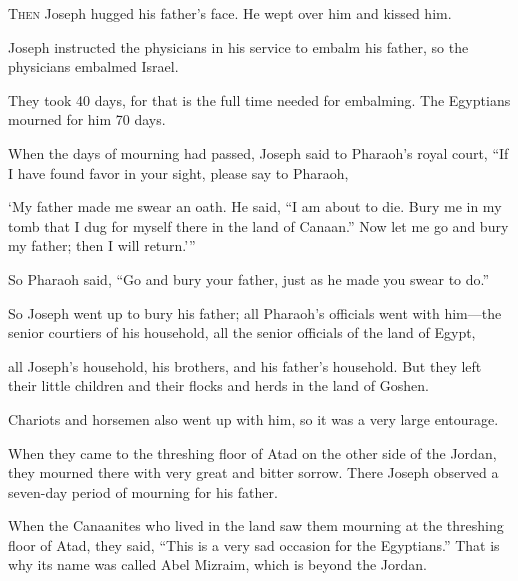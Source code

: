 \begin{scripture}
 \allowchapbreak\hypertarget{ch-genesis-50}{}\lettrine[lines=5]{\color{pentateuch}T}{\textsc{hen}} Joseph hugged his father's face. He wept over him and kissed him.\everypar{}
 Joseph instructed the physicians in his service to embalm his father, so the physicians embalmed Israel.
 They took 40 days, for that is the full time needed for embalming. The Egyptians mourned for him 70 days.
\everypar{}

 When the days of mourning had passed, Joseph said to Pharaoh's royal court, ``If I have found favor in your sight, please say to Pharaoh,
 `My father made me swear an oath. He said, ``I am about to die. Bury me in my tomb that I dug for myself there in the land of Canaan.'' Now let me go and bury my father; then I will return.'''
 So Pharaoh said, ``Go and bury your father, just as he made you swear to do.''
\everypar{}

 So Joseph went up to bury his father; all Pharaoh's officials went with him---the senior courtiers of his household, all the senior officials of the land of Egypt,
 all Joseph's household, his brothers, and his father's household. But they left their little children and their flocks and herds in the land of Goshen.
 Chariots and horsemen also went up with him, so it was a very large entourage.
\everypar{}

 When they came to the threshing floor of Atad on the other side of the Jordan, they mourned there with very great and bitter sorrow. There Joseph observed a seven-day period of mourning for his father.
 When the Canaanites who lived in the land saw them mourning at the threshing floor of Atad, they said, ``This is a very sad occasion for the Egyptians.'' That is why its name was called Abel Mizraim, which is beyond the Jordan.
\everypar{}


\end{scripture}
